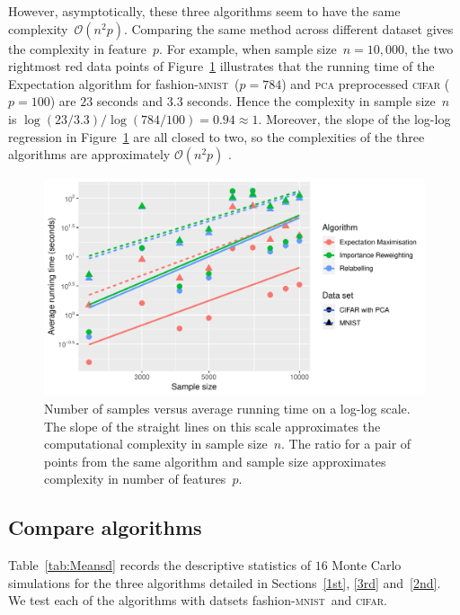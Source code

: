 \documentclass[12pt]{article} %
\newcommand{\mnist}{fashion-\textsc{mnist}\ }
\begin{document}
However, asymptotically, these three algorithms seem to have the same complexity~$\mathcal{O}(n^2p)$. Comparing the same method across different dataset gives the complexity in feature~$p$. For example, when sample size~$n=10,000$, the two rightmost red data points of Figure~\ref{fig:speed} illustrates that the running time of the Expectation  algorithm for \mnist ($p=784$) and \textsc{pca} preprocessed \textsc{cifar} ($p=100$) are $23$ seconds and $3.3$ seconds. Hence the complexity in sample size~$n$ is 
\begin{math}
    \log(23/3.3)/\log(784/100)=0.94 \approx 1.
\end{math}
Moreover, the slope of the log-log regression in Figure~\ref{fig:speed} are all closed to two, so the complexities of the three algorithms are approximately $\mathcal{O}(n^2p)$ \citep{Roberts:2014:MED:2746455}. 
\begin{figure}
	\centering
    \includegraphics[scale=.8]{speed}%
	\caption{ Number of samples versus average running time on a log-log scale. The slope of the straight lines on this scale approximates the computational complexity in sample size~$n$. The ratio for a pair of points from the same algorithm and sample size approximates complexity in number of features~$p$.
}
	\label{fig:speed}
\end{figure}
\subsection{Compare algorithms}

Table~\ref{tab:Meansd} records the descriptive statistics of $16$ Monte Carlo simulations for the three algorithms detailed in Sections~\ref{1st}, \ref{3rd} and~\ref{2nd}.  We test each of the algorithms with datsets \mnist and \textsc{cifar}.
\end{document}
